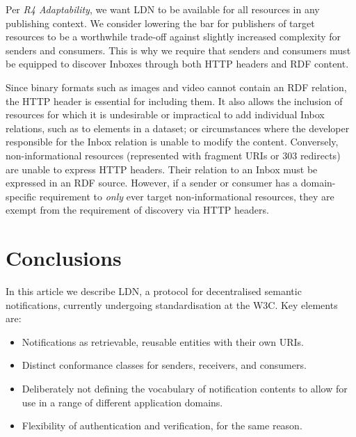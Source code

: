 \documentclass[a4paper]{llncs}
\begin{document}
\par Per {\em R4 Adaptability}, we want LDN to be available for all resources in any publishing context. We consider lowering the bar for publishers of target resources to be a worthwhile trade-off against slightly increased complexity for senders and consumers. This is why we require that senders and consumers must be equipped to discover Inboxes through both HTTP headers and RDF content.


\par Since binary formats such as images and video cannot contain an RDF relation, the HTTP header is essential for including them. It also allows the inclusion of resources for which it is undesirable or impractical to add individual Inbox relations, such as to elements in a dataset; or circumstances where the developer responsible for the Inbox relation is unable to modify the content. Conversely, non-informational resources (represented with fragment URIs or 303 redirects) are unable to express HTTP headers. Their relation to an Inbox must be expressed in an RDF source. However, if a sender or consumer has a domain-specific requirement to {\em only} ever target non-informational resources, they are exempt from the requirement of discovery via HTTP headers.






                        \section{Conclusions}
  \label{conclusions}



\par In this article we describe LDN, a protocol for decentralised semantic notifications, currently undergoing standardisation at the W3C. Key elements are:

                            \begin{itemize}
  \item Notifications as retrievable, reusable entities with their own URIs.\item Distinct conformance classes for senders, receivers, and consumers.\item Deliberately not defining the vocabulary of notification contents to allow for use in a range of different application domains.\item Flexibility of authentication and verification, for the same reason.
    \end{itemize}
\end{document}
